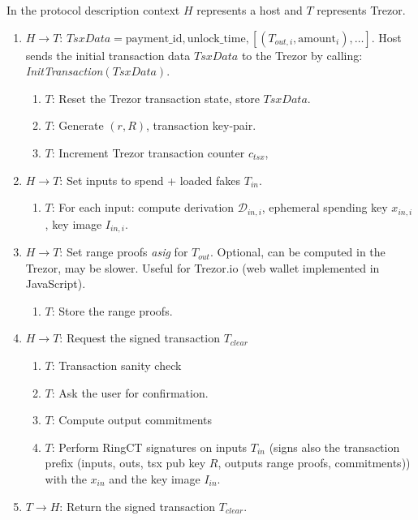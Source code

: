 \documentclass[]{article}
\begin{document}
In the protocol description context $H$ represents a host and $T$ represents Trezor.
\begin{enumerate}
	\item $H \rightarrow T$: $TsxData = \text{payment\_id},\text{unlock\_time},  \left[\left(T_{out,i}, \text{amount}_i \right), \dots \right]$. Host sends the initial transaction data $TsxData$ to the Trezor by calling: \emph{InitTransaction}$\left(TsxData\right)$.
	
	\begin{enumerate}
		\item $T$: Reset the Trezor transaction state, store $TsxData$.
		
		\item $T$: Generate $(r, R)$, transaction key-pair.
		
		\item $T$: Increment Trezor transaction counter $c_{tsx}$,
	\end{enumerate}
	
	\item $H \rightarrow T$: Set inputs to spend + loaded fakes $T_{in}$. 
	\begin{enumerate}
		\item $T$: For each input: compute derivation $\mathcal{D}_{in,i}$, ephemeral spending key $x_{in,i}$, key image $I_{in,i}$.
	\end{enumerate}
	
	\item $H \rightarrow T$: Set range proofs \emph{asig} for $T_{out}$. Optional, can be computed in the Trezor, may be slower. Useful for Trezor.io (web wallet implemented in JavaScript).
	\begin{enumerate}
		\item $T$: Store the range proofs.
	\end{enumerate}
	
	\item $H \rightarrow T$: Request the signed transaction $T_{clear}$
	\begin{enumerate}
		\item $T$: Transaction sanity check
		
        \item $T$: Ask the user for confirmation.

		\item $T$: Compute output commitments
		
		\item $T$: Perform RingCT signatures on inputs $T_{in}$ (signs also the transaction prefix (inputs, outs, tsx pub key $R$, outputs range proofs, commitments)) with the $x_{in}$ and the key image $I_{in}$.
	\end{enumerate} 
	
	\item $T \rightarrow H$: Return the signed transaction $T_{clear}$.
\end{enumerate}
\end{document}
